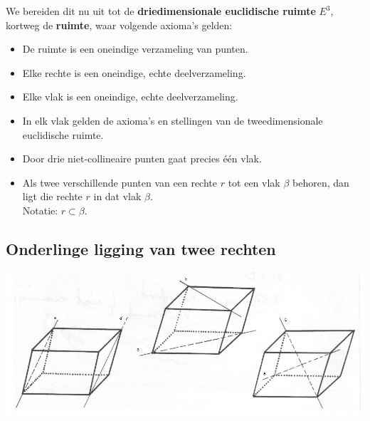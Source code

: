 \documentclass[12pt,twoside]{article}
\begin{document}
We bereiden dit nu uit tot de {\bf driedimensionale euclidische ruimte} $E^3$, kortweg de {\bf ruimte}, waar volgende axioma's gelden:
\begin{itemize}
  \item De ruimte is een oneindige verzameling van punten.
  \item Elke rechte is een oneindige, echte deelverzameling.
  \item Elke vlak is een oneindige, echte deelverzameling.
  \item In elk vlak gelden de axioma's en stellingen van de tweedimensionale euclidische ruimte.
  \item Door drie niet-collineaire punten gaat precies één vlak.
  \item Als twee verschillende punten van een rechte $r$ tot een vlak $\beta$ behoren, dan ligt die rechte $r$ in dat vlak $\beta$.\\
  Notatie: $r\subset\beta$.
\end{itemize}

\subsection{Onderlinge ligging van twee rechten}

\begin{center}
  \includegraphics[width=\textwidth]{onderlinge_ligging_twee_rechten}
\end{center}
\end{document}
